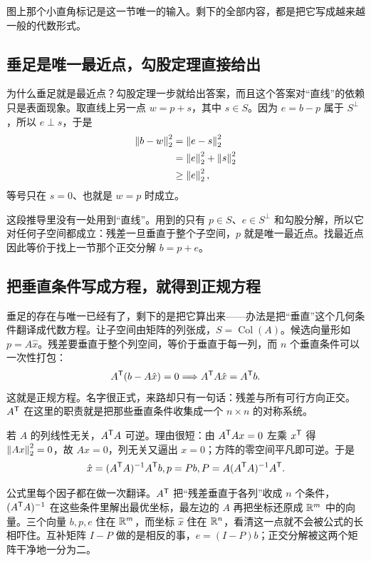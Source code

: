 图上那个小直角标记是这一节唯一的输入。剩下的全部内容，都是把它写成越来越一般的代数形式。

\subsection{垂足是唯一最近点，勾股定理直接给出}

为什么垂足就是最近点？勾股定理一步就给出答案，而且这个答案对``直线''的依赖只是表面现象。取直线上另一点 \(w=p+s\)，其中 \(s\in S\)。因为 \(e=b-p\) 属于 \(S^{\perp}\)，所以 \(e\perp s\)，于是
\[
\begin{aligned}
\left\lVert b-w\right\rVert_2^2
&=\left\lVert e-s\right\rVert_2^2\\
&=\left\lVert e\right\rVert_2^2+\left\lVert s\right\rVert_2^2\\
&\ge\left\lVert e\right\rVert_2^2 ,
\end{aligned}
\]
等号只在 \(s=0\)、也就是 \(w=p\) 时成立。

这段推导里没有一处用到``直线''。用到的只有 \(p\in S\)、\(e\in S^{\perp}\) 和勾股分解，所以它对任何子空间都成立：残差一旦垂直于整个子空间，\(p\) 就是唯一最近点。找最近点因此等价于找上一节那个正交分解 \(b=p+e\)。

\subsection{把垂直条件写成方程，就得到正规方程}

垂足的存在与唯一已经有了，剩下的是把它算出来——办法是把``垂直''这个几何条件翻译成代数方程。让子空间由矩阵的列张成，\(S=\operatorname{Col}(A)\)。候选向量形如 \(p=A\hat x\)。残差要垂直于整个列空间，等价于垂直于每一列，而 \(n\) 个垂直条件可以一次性打包：
\[
A^{\mathsf{T}}(b-A\hat x)=0
\space\Longrightarrow\space
A^{\mathsf{T}}A\hat x=A^{\mathsf{T}}b .
\]
这就是正规方程。名字很正式，来路却只有一句话：残差与所有可行方向正交。\(A^{\mathsf{T}}\) 在这里的职责就是把那些垂直条件收集成一个 \(n\times n\) 的对称系统。

若 \(A\) 的列线性无关，\(A^{\mathsf{T}}A\) 可逆。理由很短：由 \(A^{\mathsf{T}}Ax=0\) 左乘 \(x^{\mathsf{T}}\) 得 \(\left\lVert Ax\right\rVert_2^2=0\)，故 \(Ax=0\)，列无关又逼出 \(x=0\)；方阵的零空间平凡即可逆。于是
\[
\hat x=(A^{\mathsf{T}}A)^{-1}A^{\mathsf{T}}b,
\space
p=Pb,
\space
P=A(A^{\mathsf{T}}A)^{-1}A^{\mathsf{T}}.
\]

公式里每个因子都在做一次翻译。\(A^{\mathsf{T}}\) 把``残差垂直于各列''收成 \(n\) 个条件，\((A^{\mathsf{T}}A)^{-1}\) 在这些条件里解出最优坐标，最左边的 \(A\) 再把坐标还原成 \(\mathbb{R}^m\) 中的向量。三个向量 \(b,p,e\) 住在 \(\mathbb{R}^m\)，而坐标 \(\hat x\) 住在 \(\mathbb{R}^n\)，看清这一点就不会被公式的长相吓住。互补矩阵 \(I-P\) 做的是相反的事，\(e=(I-P)b\)；正交分解被这两个矩阵干净地一分为二。

